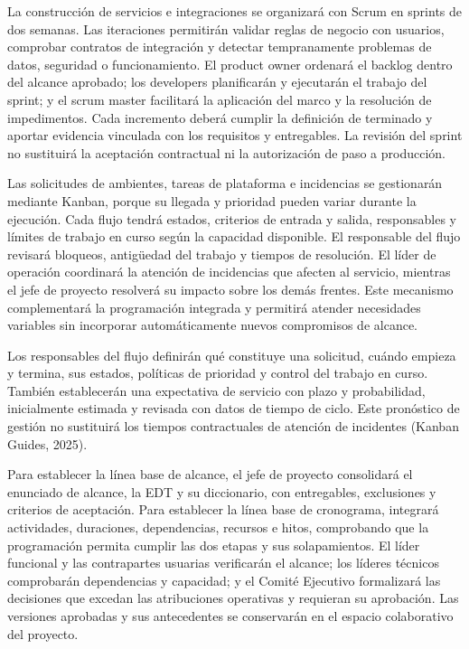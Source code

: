 \documentclass[11pt]{article}
\begin{document}
La construcción de servicios e integraciones se organizará con Scrum en
sprints de dos semanas. Las iteraciones permitirán validar reglas de
negocio con usuarios, comprobar contratos de integración y detectar
tempranamente problemas de datos, seguridad o funcionamiento. El product
owner ordenará el backlog dentro del alcance aprobado; los developers
planificarán y ejecutarán el trabajo del sprint; y el scrum master
facilitará la aplicación del marco y la resolución de impedimentos. Cada
incremento deberá cumplir la definición de terminado y aportar evidencia
vinculada con los requisitos y entregables. La revisión del sprint no
sustituirá la aceptación contractual ni la autorización de paso a
producción.

Las solicitudes de ambientes, tareas de plataforma e incidencias se
gestionarán mediante Kanban, porque su llegada y prioridad pueden variar
durante la ejecución. Cada flujo tendrá estados, criterios de entrada y
salida, responsables y límites de trabajo en curso según la capacidad
disponible. El responsable del flujo revisará bloqueos, antigüedad del
trabajo y tiempos de resolución. El líder de operación coordinará la
atención de incidencias que afecten al servicio, mientras el jefe de
proyecto resolverá su impacto sobre los demás frentes. Este mecanismo
complementará la programación integrada y permitirá atender necesidades
variables sin incorporar automáticamente nuevos compromisos de alcance.

Los responsables del flujo definirán qué constituye una solicitud,
cuándo empieza y termina, sus estados, políticas de prioridad y control
del trabajo en curso. También establecerán una expectativa de servicio
con plazo y probabilidad, inicialmente estimada y revisada con datos de
tiempo de ciclo. Este pronóstico de gestión no sustituirá los tiempos
contractuales de atención de incidentes (Kanban Guides, 2025).

Para establecer la línea base de alcance, el jefe de proyecto
consolidará el enunciado de alcance, la EDT y su diccionario, con
entregables, exclusiones y criterios de aceptación. Para establecer la
línea base de cronograma, integrará actividades, duraciones,
dependencias, recursos e hitos, comprobando que la programación permita
cumplir las dos etapas y sus solapamientos. El líder funcional y las
contrapartes usuarias verificarán el alcance; los líderes técnicos
comprobarán dependencias y capacidad; y el Comité Ejecutivo formalizará
las decisiones que excedan las atribuciones operativas y requieran su
aprobación. Las versiones aprobadas y sus antecedentes se conservarán en
el espacio colaborativo del proyecto.
\end{document}
